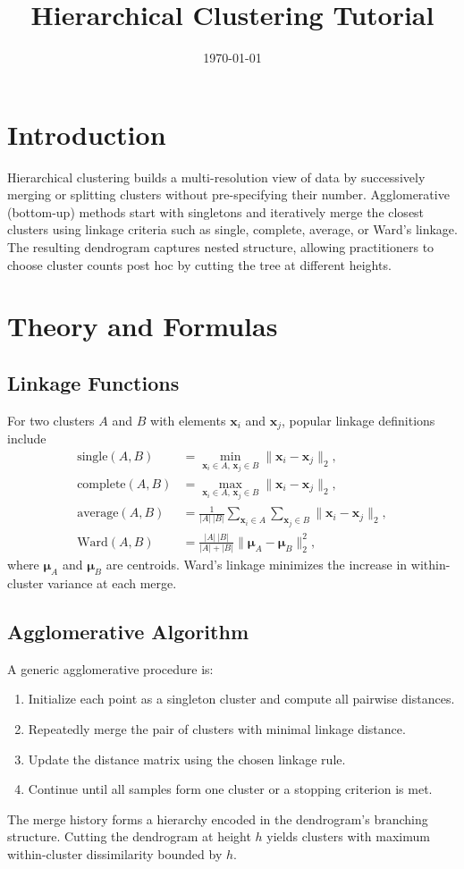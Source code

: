 ﻿\documentclass[12pt]{article}
\title{Hierarchical Clustering Tutorial}
\author{}
\date{\today}
\begin{document}
\maketitle

\section{Introduction}
Hierarchical clustering builds a multi-resolution view of data by successively merging or splitting clusters without pre-specifying their number. Agglomerative (bottom-up) methods start with singletons and iteratively merge the closest clusters using linkage criteria such as single, complete, average, or Ward's linkage. The resulting dendrogram captures nested structure, allowing practitioners to choose cluster counts post hoc by cutting the tree at different heights.

\section{Theory and Formulas}
\subsection{Linkage Functions}
For two clusters \(A\) and \(B\) with elements \(\mathbf{x}_i\) and \(\mathbf{x}_j\), popular linkage definitions include
\begin{align}
\text{single}(A,B) &= \min_{\mathbf{x}_i \in A,\, \mathbf{x}_j \in B} \lVert \mathbf{x}_i - \mathbf{x}_j \rVert_2,\\
\text{complete}(A,B) &= \max_{\mathbf{x}_i \in A,\, \mathbf{x}_j \in B} \lVert \mathbf{x}_i - \mathbf{x}_j \rVert_2,\\
\text{average}(A,B) &= \frac{1}{|A|\,|B|} \sum_{\mathbf{x}_i \in A} \sum_{\mathbf{x}_j \in B} \lVert \mathbf{x}_i - \mathbf{x}_j \rVert_2,\\
\text{Ward}(A,B) &= \frac{|A|\,|B|}{|A|+|B|} \lVert \bm{\mu}_A - \bm{\mu}_B \rVert_2^2,
\end{align}
where \(\bm{\mu}_A\) and \(\bm{\mu}_B\) are centroids. Ward's linkage minimizes the increase in within-cluster variance at each merge.

\subsection{Agglomerative Algorithm}
A generic agglomerative procedure is:
\begin{enumerate}
  \item Initialize each point as a singleton cluster and compute all pairwise distances.
  \item Repeatedly merge the pair of clusters with minimal linkage distance.
  \item Update the distance matrix using the chosen linkage rule.
  \item Continue until all samples form one cluster or a stopping criterion is met.
\end{enumerate}
The merge history forms a hierarchy encoded in the dendrogram's branching structure. Cutting the dendrogram at height \(h\) yields clusters with maximum within-cluster dissimilarity bounded by \(h\).
\end{document}
